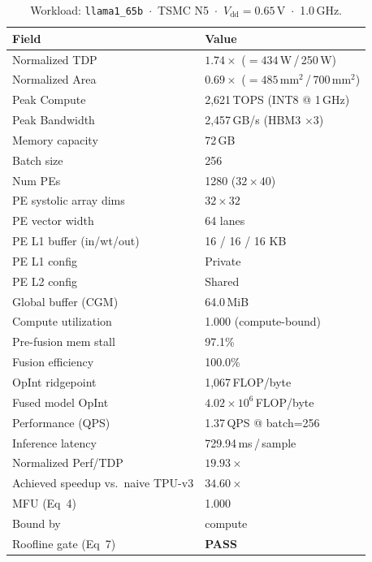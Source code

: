 \begin{table}[h]
\centering
\caption{Workload: \texttt{llama1\_65b}~$\cdot$~TSMC N5~$\cdot$~$V_\text{dd}=0.65$\,V~$\cdot$~1.0\,GHz.}
\label{tab:cheetah_v2_llama1_65b}
\small\setlength{\tabcolsep}{6pt}
\begin{tabular}{@{}ll@{}}
\toprule
\textbf{Field} & \textbf{Value} \\
\midrule
Normalized TDP          & $1.74\times$ ($= 434$\,W\,/\,250\,W) \\
Normalized Area         & $0.69\times$ ($= 485$\,mm$^2$\,/\,700\,mm$^2$) \\
Peak Compute            & 2{,}621\,TOPS (INT8 @ 1\,GHz) \\
Peak Bandwidth          & 2{,}457\,GB/s (HBM3 $\times$3) \\
Memory capacity         & 72\,GB \\
Batch size              & 256 \\
Num PEs                 & 1280 ($32 \times 40$) \\
PE systolic array dims  & $32 \times 32$ \\
PE vector width         & 64 lanes \\
PE L1 buffer (in/wt/out) & 16 / 16 / 16 KB \\
PE L1 config            & Private \\
PE L2 config            & Shared \\
Global buffer (CGM)     & 64.0\,MiB \\
\midrule
Compute utilization     & 1.000 (compute-bound) \\
Pre-fusion mem stall    & 97.1\% \\
Fusion efficiency       & 100.0\% \\
OpInt ridgepoint        & 1{,}067\,FLOP/byte \\
Fused model OpInt       & $4.02 \times 10^{6}$\,FLOP/byte \\
Performance (QPS)       & 1.37\,QPS @ batch=256 \\
Inference latency       & 729.94\,ms\,/\,sample \\
Normalized Perf/TDP     & $19.93\times$ \\
Achieved speedup vs.\ naive TPU-v3 & $34.60\times$ \\
MFU (Eq~4)              & 1.000 \\
Bound by                & compute \\
Roofline gate (Eq~7)    & \textcolor{green!60!black}{\textbf{PASS}} \\

\end{tabular}
\end{table}
